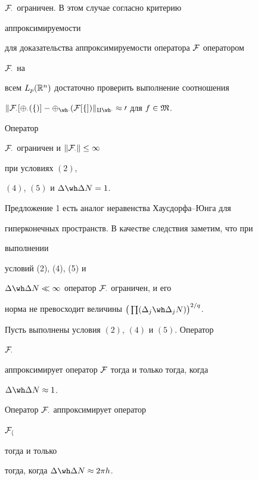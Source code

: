 $\cal F_\Delta$ ограничен. В этом случае согласно критерию 


аппроксимируемости 


для доказательства аппроксимируемости оператора $\cal F$ оператором 


$\cal F_\Delta$ на 


всем $L_p(\Bbb R^n)$ достаточно проверить выполнение соотношения 


$\|\cal F_\Delta[\Phi_\Delta(f)]-\Phi_{\wh\Delta}(\cal 


F[f])\|_{q\wh\Delta}\approx 0$ для $f\in\frak M$. 


 


\begin{prop} Оператор 


$\cal F_\Delta$ ограничен и $\|\cal F_\Delta\|\le 1$ 


при условиях $(2)$, 


$(4)$, $(5)$ и $\Delta\wh\Delta N=1$. 


\end{prop} 


 


Предложение 1 есть аналог неравенства Хаусдорфа--Юнга для 


гиперконечных пространств. В качестве следствия заметим, что при 


выполнении 


условий (2), (4), (5) и 


$\Delta\wh\Delta N\ll\infty$ оператор $\cal F_\Delta$ ограничен, и его 


норма не превосходит величины $\big(\prod(\Delta_j\wh\Delta_j 


N)\big)^{2/q}$. 


 


\begin{thm} Пусть выполнены условия $(2)$, $(4)$ и $(5)$. Оператор 


$\cal F_\Delta$ 


аппроксимирует оператор $\cal F$ тогда и только тогда, когда 


$\Delta\wh\Delta N\approx 1$. 


\end{thm} 


 


\begin{cornonum} Оператор $\cal F_\Delta$ аппроксимирует оператор 


$\cal F_h$ 


тогда и только 


тогда, когда $\Delta\wh\Delta N\approx2\pi h$. 


\end{cornonum} 


